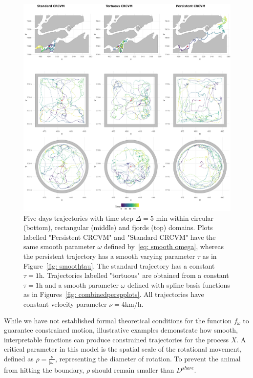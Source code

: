 \documentclass[aoas]{imsart}
\theoremstyle{definition}
\theoremstyle{remark}
\theoremstyle{remark}
\newcommand {\1}{\mathbb{1}}
\begin{document}
\begin{figure}[ht!]
	\includegraphics[scale=0.4]{images/crcvm/final_combined_plot.png}

	\caption{Five days trajectories with time step $\Delta=5$ min within circular (bottom), rectangular (middle) and fjords (top) domains. Plots labelled "Persistent CRCVM" and "Standard CRCVM" have the same smooth parameter $\omega$ defined by~\eqref{eq: smooth omega}, whereas the persistent trajectory has a smooth varying parameter $\tau$ as in Figure~\ref{fig: smoothtau}. The standard trajectory has a constant $\tau =1$h. Trajectories labelled "tortuous" are obtained from a constant $\tau=1$h and a smooth parameter $\omega$ defined with spline basis functions as in Figures~\ref{fig: combinedperspplots}. All trajectories have constant velocity parameter $\nu=4$km/h.}
 \label{fig: crcvm examples}
\end{figure}



While we have not established formal theoretical conditions for the function $f_{\omega}$ to guarantee constrained motion,   illustrative examples demonstrate how smooth, interpretable functions can produce constrained trajectories for the process $X$. A critical parameter in this model is the spatial scale of the rotational movement, defined as $\rho=\frac{\nu}{\vert \omega \vert}$, representing the diameter of rotation. To prevent the animal from hitting the boundary, $\rho$ should remain smaller than $D^{shore}$.\\
\end{document}
